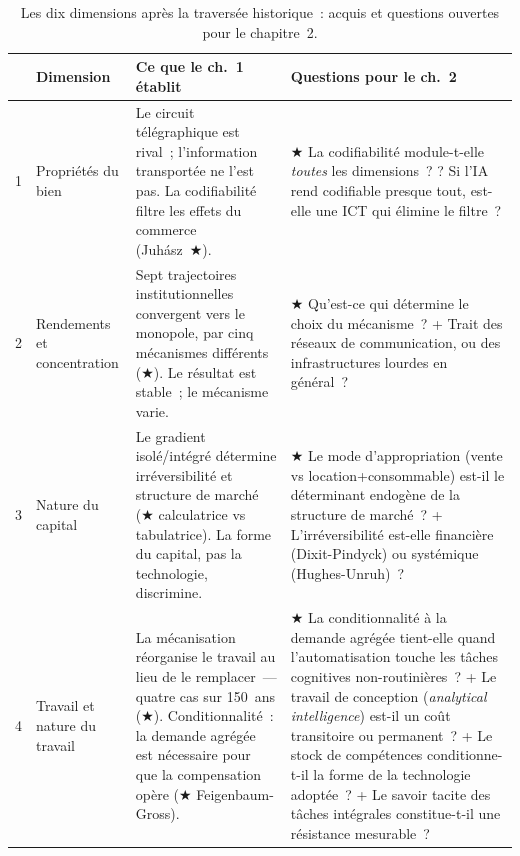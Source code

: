 \begin{table}[p]
\caption{Les dix dimensions après la traversée historique~: acquis et questions ouvertes pour le chapitre~2.}\label{tab:ch1-questions}
\centering\scriptsize
\renewcommand{\arraystretch}{1.18}
\begin{tabularx}{\textwidth}{@{}cp{1.8cm}Xp{5.2cm}@{}}
\toprule
 & \textbf{Dimension} & \textbf{Ce que le ch.~1 établit} & \textbf{Questions pour le ch.~2} \\
\midrule
1 & Propriétés du bien & Le circuit télégraphique est rival~; l'information transportée ne l'est pas. La codifiabilité filtre les effets du commerce (Juhász~★). & ★ La codifiabilité module-t-elle \emph{toutes} les dimensions~? \newline ? Si l'IA rend codifiable presque tout, est-elle une ICT qui élimine le filtre~? \\[4pt]
2 & Rendements et concentration & Sept trajectoires institutionnelles convergent vers le monopole, par cinq mécanismes différents (★). Le résultat est stable~; le mécanisme varie. & ★ Qu'est-ce qui détermine le choix du mécanisme~? \newline + Trait des réseaux de communication, ou des infrastructures lourdes en général~? \\[4pt]
3 & Nature du capital & Le gradient isolé/intégré détermine irréversibilité et structure de marché (★ calculatrice vs tabulatrice). La forme du capital, pas la technologie, discrimine. & ★ Le mode d'appropriation (vente vs location+consommable) est-il le déterminant endogène de la structure de marché~? \newline + L'irréversibilité est-elle financière (Dixit-Pindyck) ou systémique (Hughes-Unruh)~? \\[4pt]
4 & Travail et nature du travail & La mécanisation réorganise le travail au lieu de le remplacer~--- quatre cas sur 150~ans (★). Conditionnalité~: la demande agrégée est nécessaire pour que la compensation opère (★ Feigenbaum-Gross). & ★ La conditionnalité à la demande agrégée tient-elle quand l'automatisation touche les tâches cognitives non-routinières~? \newline + Le travail de conception (\emph{analytical intelligence}) est-il un coût transitoire ou permanent~? \newline + Le stock de compétences conditionne-t-il la forme de la technologie adoptée~? \newline + Le savoir tacite des tâches intégrales constitue-t-il une résistance mesurable~? \\[4pt]

\end{tabularx}
\end{table}
